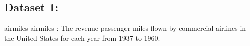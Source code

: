 \subsection{Dataset 1:}
 airmiles
airmiles : The revenue passenger miles flown by commercial airlines in the United States for each year from 1937 to 1960.